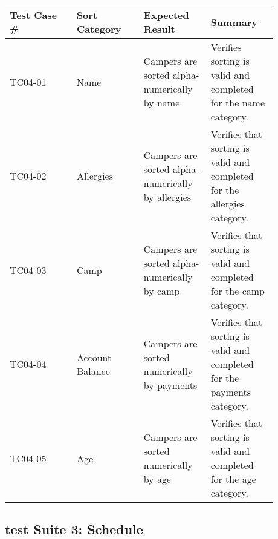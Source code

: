 \documentclass[11pt]{article}
\begin{document}
\begin{center}
\begin{longtable}{|p{0.22\linewidth}|p{0.22\linewidth}|p{0.22\linewidth}|p{0.22\linewidth}|}
	\hline
	Test Case \# & Sort Category & Expected Result & Summary\\\hline
	TC04-01 & Name & Campers are sorted alpha-numerically by name & Verifies sorting is valid and completed for the name category.\vspace*{1em}\\\hline
	TC04-02 & Allergies & Campers are sorted alpha-numerically by allergies & Verifies that sorting is valid and completed for the allergies category.\vspace*{1em}\\	\hline
	TC04-03 & Camp & Campers are sorted alpha-numerically by camp & Verifies that sorting is valid and completed for the camp category.\vspace*{1em}\\\hline
	TC04-04 & Account Balance & Campers are sorted numerically by payments & Verifies that sorting is valid and completed for the payments category.\vspace*{1em}\\\hline
	TC04-05 & Age & Campers are sorted numerically by age & Verifies that sorting is valid and completed for the age category.\vspace*{1em}\\\hline
\end{longtable}
\end{center}
\clearpage


\subsection*{test Suite 3: Schedule}
\end{document}
